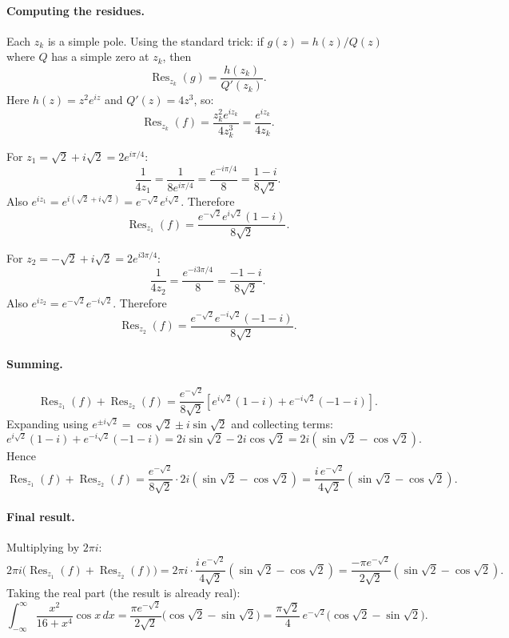 \paragraph{Computing the residues.}
Each $z_k$ is a simple pole. Using the standard trick: if $g(z)=h(z)/Q(z)$ where $Q$ has a simple zero at $z_k$, then
\[
\operatorname{Res}_{z_k}(g)=\frac{h(z_k)}{Q'(z_k)}.
\]
Here $h(z)=z^2 e^{iz}$ and $Q'(z)=4z^3$, so:
\[
\operatorname{Res}_{z_k}(f)
=\frac{z_k^2 e^{iz_k}}{4 z_k^3}
=\frac{e^{iz_k}}{4 z_k}.
\]

For $z_1=\sqrt{2}+i\sqrt{2}=2e^{i\pi/4}$:
\[
\frac{1}{4z_1}=\frac{1}{8 e^{i\pi/4}}=\frac{e^{-i\pi/4}}{8}=\frac{1-i}{8\sqrt{2}}.
\]
Also $e^{iz_1}=e^{i(\sqrt{2}+i\sqrt{2})}=e^{-\sqrt{2}}e^{i\sqrt{2}}$. Therefore
\[
\operatorname{Res}_{z_1}(f)
=\frac{e^{-\sqrt{2}}e^{i\sqrt{2}}(1-i)}{8\sqrt{2}}.
\]

For $z_2=-\sqrt{2}+i\sqrt{2}=2e^{i3\pi/4}$:
\[
\frac{1}{4z_2}=\frac{e^{-i3\pi/4}}{8}=\frac{-1-i}{8\sqrt{2}}.
\]
Also $e^{iz_2}=e^{-\sqrt{2}}e^{-i\sqrt{2}}$. Therefore
\[
\operatorname{Res}_{z_2}(f)
=\frac{e^{-\sqrt{2}}e^{-i\sqrt{2}}(-1-i)}{8\sqrt{2}}.
\]

\paragraph{Summing.}
\[
\operatorname{Res}_{z_1}(f)+\operatorname{Res}_{z_2}(f)
=\frac{e^{-\sqrt{2}}}{8\sqrt{2}}\left[e^{i\sqrt{2}}(1-i)+e^{-i\sqrt{2}}(-1-i)\right].
\]
Expanding using $e^{\pm i\sqrt{2}}=\cos\sqrt{2}\pm i\sin\sqrt{2}$ and collecting terms:
\[
e^{i\sqrt{2}}(1-i)+e^{-i\sqrt{2}}(-1-i)
=2i\sin\sqrt{2}-2i\cos\sqrt{2}
=2i(\sin\sqrt{2}-\cos\sqrt{2}).
\]
Hence
\[
\operatorname{Res}_{z_1}(f)+\operatorname{Res}_{z_2}(f)
=\frac{e^{-\sqrt{2}}}{8\sqrt{2}}\cdot 2i(\sin\sqrt{2}-\cos\sqrt{2})
=\frac{i\,e^{-\sqrt{2}}}{4\sqrt{2}}(\sin\sqrt{2}-\cos\sqrt{2}).
\]

\paragraph{Final result.}
Multiplying by $2\pi i$:
\[
2\pi i\bigl(\operatorname{Res}_{z_1}(f)+\operatorname{Res}_{z_2}(f)\bigr)
=2\pi i \cdot \frac{i\,e^{-\sqrt{2}}}{4\sqrt{2}}(\sin\sqrt{2}-\cos\sqrt{2})
=\frac{-\pi e^{-\sqrt{2}}}{2\sqrt{2}}(\sin\sqrt{2}-\cos\sqrt{2}).
\]
Taking the real part (the result is already real):
\[
\boxed{\int_{-\infty}^{\infty} \frac{x^2}{16+x^4}\cos x\,dx
=\frac{\pi e^{-\sqrt{2}}}{2\sqrt{2}}\bigl(\cos\sqrt{2}-\sin\sqrt{2}\bigr)
=\frac{\pi\sqrt{2}}{4}\,e^{-\sqrt{2}}\bigl(\cos\sqrt{2}-\sin\sqrt{2}\bigr).}
\]

